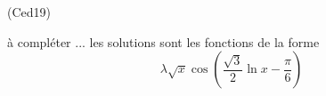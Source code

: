 \begin{tiny}(Ced19)\end{tiny} à compléter ... les solutions sont les fonctions de la forme
\begin{displaymath}
  \lambda\sqrt{x} \cos\left( \frac{\sqrt{3}}{2}\ln x - \frac{\pi}{6}\right) 
\end{displaymath}

